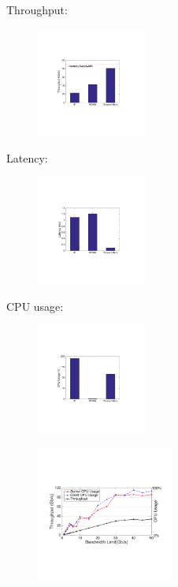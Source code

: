Throughput:
     \begin{figure}[ht]
     \centering 
     \includegraphics[width=0.32\textwidth]{figures/motivation/eval_baremetal_thr.pdf}      
     \label{fig:eval_baremetal_thr}
     \caption{} 
     \end{figure}

Latency:    
     \begin{figure}[ht]
     \centering 
     \includegraphics[width=0.32\textwidth]{figures/motivation/eval_baremetal_latency.pdf}      
     \label{fig:eval_baremetal_latency}
     \caption{} 
     \end{figure}

CPU usage:     
     \begin{figure}[ht]
     \centering 
     \includegraphics[width=0.32\textwidth]{figures/motivation/eval_baremetal_cpu.pdf}      
     \label{fig:eval_baremetal_cpu}
     \caption{} 
     \end{figure}
     
     \begin{figure}[ht]
     \centering 
     \includegraphics[width=0.4\textwidth]{figures/motivation/eval_bw_cpu.pdf}      
     \label{fig:eval_bw_cpu}
     \caption{} 
     \end{figure}
     
